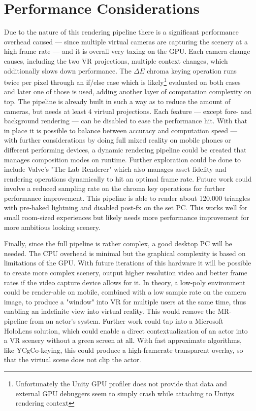 \section{Performance Considerations}

Due to the nature of this rendering pipeline there is a significant performance 
overhead caused --- since multiple virtual cameras are capturing the scenery at 
a high frame rate --- and it is overall very taxing on the GPU. Each camera 
change causes, including the two VR projections, multiple context changes, 
which additionally slows down performance. The $\Delta E$ chroma keying 
operation runs twice per pixel through an if/else case which is 
likely\footnote{Unfortunately the Unity GPU profiler does not provide that 
data and external GPU debuggers seem to simply crash while attaching to Unitys 
rendering context} evaluated on both cases and later one of those is used, 
adding another layer of computation complexity on top. 
\newline
The pipeline is already built in such a way as to reduce the amount of cameras, 
but needs at least 4 virtual projections. Each feature --- except fore- and 
background  rendering --- can be disabled to ease the performance hit. With 
that in place it is possible to balance between accuracy and computation speed 
--- with further considerations by doing full mixed reality on mobile phones or 
different performing devices, a dynamic rendering pipeline could be created 
that manages composition modes on runtime. Further exploration could be done to 
include Valve's "The Lab Renderer" which also manages asset fidelity and 
rendering operations dynamically to hit an optimal frame rate. Future work 
could involve a reduced sampling rate on the chroma key operations for further 
performance improvement.
\newline
This pipeline is able to render about 120.000 triangles with pre-baked 
lightning and disabled post-fx on the set PC. This works well for small 
room-sized experiences but likely needs more performance improvement for 
more ambitious looking scenery.

Finally, since the full pipeline is rather complex, a good desktop PC will be 
needed. The CPU overhead is minimal but the graphical complexity is based on 
limitations of the GPU. With future iterations of this hardware it will be 
possible to create more complex scenery, output higher resolution video and 
better frame rates if the video capture device allows for it.
\newline
In theory, a low-poly environment could be render-able on mobile, combined with 
a low sample rate on the camera image, to produce a "window" into VR for 
multiple users at the same time, thus enabling an indefinite view into virtual 
reality. This would remove the MR-pipeline from an actor's system. Further work 
could tap into a Microsoft HoloLens solution, which could enable a direct 
contextualization of an actor into a VR scenery without a green screen at all. 
With fast approximate algorithms, like YCgCo-keying, this could produce a 
high-framerate transparent overlay, so that the virtual scene does not clip the 
actor.

